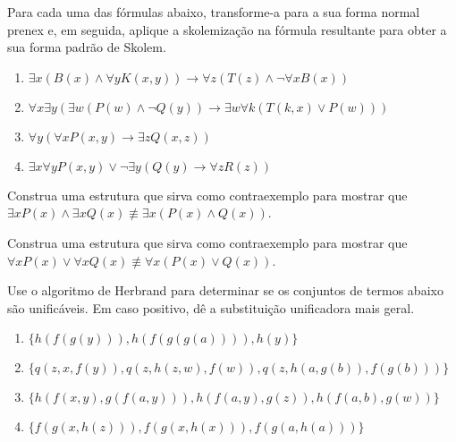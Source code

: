 \begin{exercises}
    \begin{question}
       Para cada uma das fórmulas abaixo, transforme-a para a sua forma normal prenex e, em seguida, aplique a skolemização na fórmula resultante para obter a sua forma padrão de Skolem.
       
       \begin{enumerate}
           \item $\exists x(B(x) \land \forall y K(x, y)) \rightarrow \forall z(T(z) \land \neg \forall x B(x))$
           \item $\forall x \exists y(\exists w (P(w) \land \neg Q(y)) \rightarrow \exists w \forall k (T(k, x) \lor P(w)))$
           \item $\forall y(\forall x P(x, y) \rightarrow \exists z Q(x, z))$
           \item $\exists x \forall y P(x, y) \lor \neg \exists y(Q(y) \rightarrow \forall z R(z))$
       \end{enumerate}
    \end{question}

    \begin{question}
        Construa uma estrutura que sirva como contraexemplo para mostrar que $\exists x P(x) \land \exists x Q(x) \not\equiv \exists x(P(x) \land Q(x))$.
    \end{question}

    \begin{question}
        Construa uma estrutura que sirva como contraexemplo para mostrar que $\forall x P(x) \lor \forall x Q(x) \not\equiv \forall x(P(x) \lor Q(x))$.
    \end{question}

    \begin{question}
        Use o algoritmo de Herbrand para determinar se os conjuntos de termos abaixo são unificáveis. Em caso positivo, dê a substituição unificadora mais geral.
        \begin{enumerate}
            \item $\{h(f(g(y))), h(f(g(g(a)))), h(y)\}$
            \item $\{q(z,x,f(y)), q(z, h(z,w), f(w)), q(z, h(a, g(b)), f(g(b)))\}$
            \item $\{h(f(x, y), g(f(a, y))), h(f(a,y), g(z)), h(f(a,b), g(w))\}$
            \item $\{f(g(x, h(z))), f(g(x, h(x))), f(g(a, h(a)))\}$
        \end{enumerate}
    \end{question}


\end{exercises}
